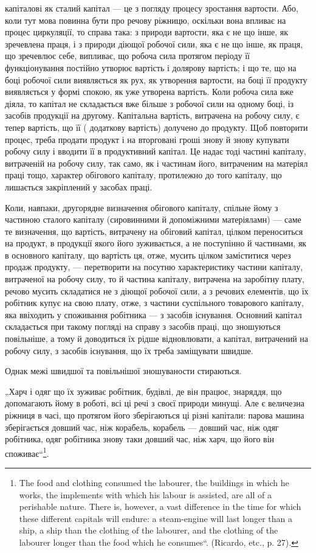 \parcont{}  %
капіталові як сталий капітал — це з погляду процесу зростання вартости.
Або, коли тут мова повинна бути про речову ріжницю, оскільки вона
впливає на процес циркуляції, то справа така: з природи вартости, яка є
не що інше, як зречевлена праця, і з природи діющої робочої сили, яка
є не що інше, як праця, що зречевлює себе, випливає, що робоча сила
протягом періоду її функціонування постійно утворює вартість і долярову
вартість; і що те, що на боці робочої сили виявляється як рух, як
утворення вартости, на боці її продукту виявляється у формі спокою,
як уже утворена вартість. Коли робоча сила вже діяла, то капітал не
складається вже більше з робочої сили на одному боці, із засобів продукції
на другому. Капітальна вартість, витрачена на робочу силу, є тепер
вартість, що її (\dplus{} додаткову вартість) долучено до продукту. Щоб
повторити процес, треба продати продукт і на вторговані гроші знову й
знову купувати робочу силу і вводити її в продуктивний капітал. Це
надає тоді частині капіталу, витраченій на робочу силу, так само, як і частинам
його, витраченим на матеріял праці тощо, характер обігового капіталу,
протилежно до того капіталу, що лишається закріплений у засобах праці.

Коли, навпаки, другорядне визначення обігового капіталу, спільне
йому з частиною сталого капіталу (сировинними й допоміжними матеріяламн)
— саме те визначення, що вартість, витрачену на обіговий капітал,
цілком переноситься на продукт, в продукції якого його зуживається, а
не поступінно й частинами, як в основного капіталу, що вартість ця,
отже, мусить цілком заміститися через продаж продукту, — перетворити
на посутню характеристику частини капіталу, витраченої на робочу силу,
то й частина капіталу, витрачена на заробітну плату, речово мусить
складатися не з діющої робочої сили, а з речових елементів, що їх робітник
купує на свою плату, отже, з частини суспільного товарового капіталу,
яка ввіходить у споживання робітника — з засобів існування.
Основний капітал складається при такому погляді на справу з засобів
праці, що зношуються повільніше, а тому й доводиться їх рідше відновлювати,
а капітал, витрачений на робочу силу, з засобів існування, що
їх треба заміщувати швидше.

Однак межі швидшої та повільнішої зношуваности стираються.

„Харч і одяг що їх зуживає робітник, будівлі, де він працює, знаряддя,
що допомагають йому в роботі, всі ці речі з своєї природи минущі.
Але є величезна ріжниця в часі, що протягом його зберігаються
ці різні капітали: парова машина зберігається довший час, ніж корабель,
корабель — довший час, ніж одяг робітника, одяг робітника знову таки
довший час, ніж харч, що його він споживає“\footnote{
The food and clothing consumed the labourer, the buildings in which he
works, the implements with which his labour is assisted, are all of a perishable
nature. There is, however, a vast difference in the time for which these different
capitals will endure: a steam-engine will last longer than a ship, a ship than the
clothing of the labourer, and the clothing of the labourer longer than the food which
he consumes“. (Ricardo, etc., p. 27).
}.

